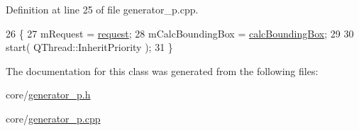 Definition at line 25 of file generator\+\_\+p.\+cpp.


\begin{DoxyCode}
26 \{
27     mRequest = \hyperlink{classOkular_1_1PixmapGenerationThread_a1238aa6b9c9aa1e7c1a5fb6b9592afab}{request};
28     mCalcBoundingBox = \hyperlink{classOkular_1_1PixmapGenerationThread_a4dcec1fa684a0c71be9d592d2d021a69}{calcBoundingBox};
29 
30     start( QThread::InheritPriority );
31 \}
\end{DoxyCode}


The documentation for this class was generated from the following files\+:\begin{DoxyCompactItemize}
\item 
core/\hyperlink{generator__p_8h}{generator\+\_\+p.\+h}\item 
core/\hyperlink{generator__p_8cpp}{generator\+\_\+p.\+cpp}\end{DoxyCompactItemize}
